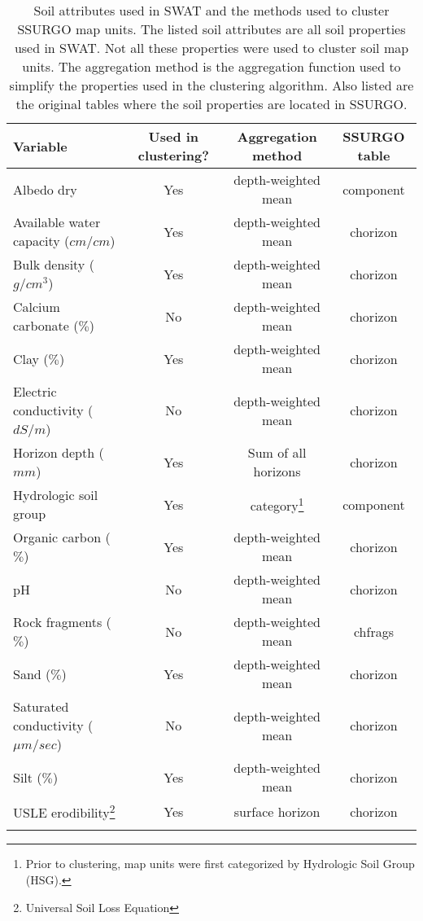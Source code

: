 \begin{table}[h]
	
	\caption{Soil attributes used in SWAT and the methods used to cluster SSURGO map units. The listed soil attributes are all soil properties used in SWAT. Not all these properties were used to cluster soil map units. The aggregation method is the aggregation function used to simplify the properties used in the clustering algorithm. Also listed are the original tables where the soil properties are located in SSURGO.}
	\centering
	\begin{tabular}{lccc}
		\hline
		Variable                               & Used in clustering? & Aggregation method  & SSURGO table \\
		\hline \hline
		Albedo dry                             & Yes                 & depth-weighted mean & component    \\
		Available water capacity ($cm / cm$)   & Yes                 & depth-weighted mean & chorizon     \\
		Bulk density ($g / cm^3$)              & Yes                 & depth-weighted mean & chorizon     \\
		Calcium carbonate ($\%$)               & No                  & depth-weighted mean & chorizon     \\
		Clay ($\%$)                            & Yes                 & depth-weighted mean & chorizon     \\
		Electric conductivity ($dS / m$)       & No                  & depth-weighted mean & chorizon     \\
		Horizon depth ($mm$)                   & Yes                 & Sum of all horizons & chorizon     \\
		Hydrologic soil group                  & Yes                 & category\footnote{Prior to clustering, map units were first categorized by Hydrologic Soil Group (HSG).}           & component    \\
		Organic carbon ($\%$)                  & Yes                 & depth-weighted mean & chorizon     \\
		pH                                     & No                  & depth-weighted mean & chorizon     \\
		Rock fragments ($\%$)                  & No                  & depth-weighted mean & chfrags      \\
		Sand ($\%$)                            & Yes                 & depth-weighted mean & chorizon     \\
		Saturated conductivity ($\mu m / sec$) & No                  & depth-weighted mean & chorizon     \\
		Silt ($\%$)                            & Yes                 & depth-weighted mean & chorizon     \\
		USLE erodibility\footnote{Universal Soil Loss Equation}                       & Yes                 & surface horizon     & chorizon     \\
		\hline
		\label{table:soil_attr_in_swat}
	\end{tabular}
\end{table}